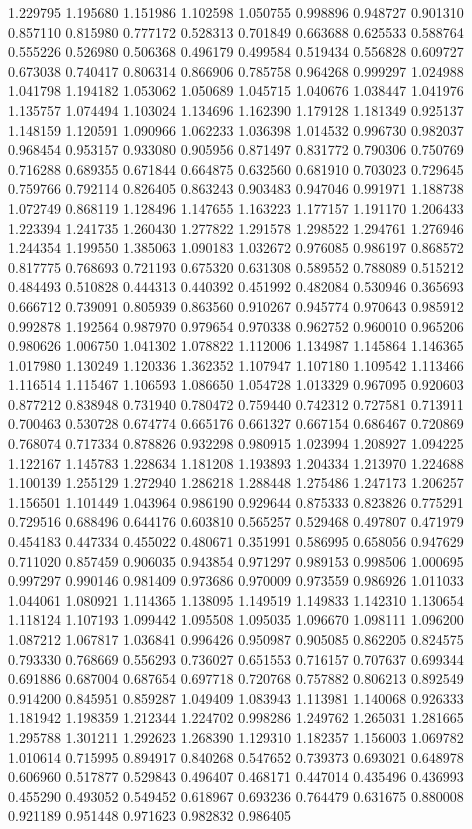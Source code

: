 1.229795
1.195680
1.151986
1.102598
1.050755
0.998896
0.948727
0.901310
0.857110
0.815980
0.777172
0.528313
0.701849
0.663688
0.625533
0.588764
0.555226
0.526980
0.506368
0.496179
0.499584
0.519434
0.556828
0.609727
0.673038
0.740417
0.806314
0.866906
0.785758
0.964268
0.999297
1.024988
1.041798
1.194182
1.053062
1.050689
1.045715
1.040676
1.038447
1.041976
1.135757
1.074494
1.103024
1.134696
1.162390
1.179128
1.181349
0.925137
1.148159
1.120591
1.090966
1.062233
1.036398
1.014532
0.996730
0.982037
0.968454
0.953157
0.933080
0.905956
0.871497
0.831772
0.790306
0.750769
0.716288
0.689355
0.671844
0.664875
0.632560
0.681910
0.703023
0.729645
0.759766
0.792114
0.826405
0.863243
0.903483
0.947046
0.991971
1.188738
1.072749
0.868119
1.128496
1.147655
1.163223
1.177157
1.191170
1.206433
1.223394
1.241735
1.260430
1.277822
1.291578
1.298522
1.294761
1.276946
1.244354
1.199550
1.385063
1.090183
1.032672
0.976085
0.986197
0.868572
0.817775
0.768693
0.721193
0.675320
0.631308
0.589552
0.788089
0.515212
0.484493
0.510828
0.444313
0.440392
0.451992
0.482084
0.530946
0.365693
0.666712
0.739091
0.805939
0.863560
0.910267
0.945774
0.970643
0.985912
0.992878
1.192564
0.987970
0.979654
0.970338
0.962752
0.960010
0.965206
0.980626
1.006750
1.041302
1.078822
1.112006
1.134987
1.145864
1.146365
1.017980
1.130249
1.120336
1.362352
1.107947
1.107180
1.109542
1.113466
1.116514
1.115467
1.106593
1.086650
1.054728
1.013329
0.967095
0.920603
0.877212
0.838948
0.731940
0.780472
0.759440
0.742312
0.727581
0.713911
0.700463
0.530728
0.674774
0.665176
0.661327
0.667154
0.686467
0.720869
0.768074
0.717334
0.878826
0.932298
0.980915
1.023994
1.208927
1.094225
1.122167
1.145783
1.228634
1.181208
1.193893
1.204334
1.213970
1.224688
1.100139
1.255129
1.272940
1.286218
1.288448
1.275486
1.247173
1.206257
1.156501
1.101449
1.043964
0.986190
0.929644
0.875333
0.823826
0.775291
0.729516
0.688496
0.644176
0.603810
0.565257
0.529468
0.497807
0.471979
0.454183
0.447334
0.455022
0.480671
0.351991
0.586995
0.658056
0.947629
0.711020
0.857459
0.906035
0.943854
0.971297
0.989153
0.998506
1.000695
0.997297
0.990146
0.981409
0.973686
0.970009
0.973559
0.986926
1.011033
1.044061
1.080921
1.114365
1.138095
1.149519
1.149833
1.142310
1.130654
1.118124
1.107193
1.099442
1.095508
1.095035
1.096670
1.098111
1.096200
1.087212
1.067817
1.036841
0.996426
0.950987
0.905085
0.862205
0.824575
0.793330
0.768669
0.556293
0.736027
0.651553
0.716157
0.707637
0.699344
0.691886
0.687004
0.687654
0.697718
0.720768
0.757882
0.806213
0.892549
0.914200
0.845951
0.859287
1.049409
1.083943
1.113981
1.140068
0.926333
1.181942
1.198359
1.212344
1.224702
0.998286
1.249762
1.265031
1.281665
1.295788
1.301211
1.292623
1.268390
1.129310
1.182357
1.156003
1.069782
1.010614
0.715995
0.894917
0.840268
0.547652
0.739373
0.693021
0.648978
0.606960
0.517877
0.529843
0.496407
0.468171
0.447014
0.435496
0.436993
0.455290
0.493052
0.549452
0.618967
0.693236
0.764479
0.631675
0.880008
0.921189
0.951448
0.971623
0.982832
0.986405
